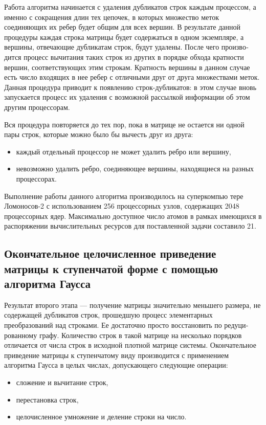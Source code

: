 Работа алгоритма начинается с удаления дубликатов строк каждым про­цессом, а именно с сокращения длин тех цепочек, в которых множество меток соединяющих их ребер будет общим для всех вершин. В результате данной процедуры каждая строка матрицы будет содержаться в одном экземпляре, а вершины, отвечающие дубликатам строк, будут удалены. После чего произво­дится процесс вычитания таких строк из других в порядке обхода кратности вершин, соответствующих этим строкам. Кратность вершины в данном случае есть число входящих в нее ребер с отличными друг от друга множествами ме­ток. Данная процедура приводит к появлению строк-дубликатов: в этом случае вновь запускается процесс их удаления с возможной рассылкой информации об этом другим процессорам.

Вся процедура повторяется до тех пор, пока в матрице не остается ни одной пары строк, которые можно было бы вычесть друг из друга:
\begin{itemize}
\item{каждый отдельный процессор не может удалить ребро или вершину,}
\item{невозможно удалить ребро, соединяющее вершины, находящиеся на раз­ных процессорах.}
\end{itemize}

Выполнение работы данного алгоритма производилось на суперкомпью­ тере Ломоносов-2 с использованием 256 процессорных узлов, содержащих 2048 процессорных ядер. Максимально доступное число атомов в рамках имеющихся в распоряжении вычислительных ресурсов для поставленной задачи состави­ло 21.

\subsection{Окончательное целочисленное приведение матрицы к ступенчатой форме с помощью алгоритма Гаусса}\label{subsec:ch4/subsect3}
Результат второго этапа --- получение матрицы значительно меньшего размера, не содержащей дубликатов строк, прошедшую процесс элементарных преобразований над строками. Ее достаточно просто восстановить по редуци­рованному графу. Количество строк в такой матрице на несколько порядков отличается от числа строк в исходной плотной матрице системы. Окончатель­ное приведение матрицы к ступенчатому виду производится с применением алгоритма Гаусса в целых числах, допускающего следующие операции:
\begin{itemize}
\item{сложение и вычитание строк,}
\item{перестановка строк,}
\item{целочисленное умножение и деление строки на число.}
\end{itemize}

